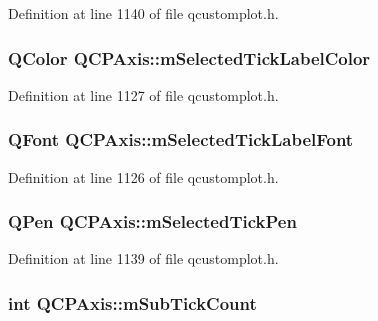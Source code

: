 Definition at line 1140 of file qcustomplot.\-h.

\hypertarget{class_q_c_p_axis_a3bcad40902f45dc4c991a2c3e4d31d70}{
\subsubsection[{m\-Selected\-Tick\-Label\-Color}]{\setlength{\rightskip}{0pt plus 5cm}Q\-Color Q\-C\-P\-Axis\-::m\-Selected\-Tick\-Label\-Color\hspace{0.3cm}{\ttfamily [protected]}}}\label{class_q_c_p_axis_a3bcad40902f45dc4c991a2c3e4d31d70}


Definition at line 1127 of file qcustomplot.\-h.

\hypertarget{class_q_c_p_axis_a4f2e4919da9615dac612662c249b1119}{
\subsubsection[{m\-Selected\-Tick\-Label\-Font}]{\setlength{\rightskip}{0pt plus 5cm}Q\-Font Q\-C\-P\-Axis\-::m\-Selected\-Tick\-Label\-Font\hspace{0.3cm}{\ttfamily [protected]}}}\label{class_q_c_p_axis_a4f2e4919da9615dac612662c249b1119}


Definition at line 1126 of file qcustomplot.\-h.

\hypertarget{class_q_c_p_axis_a9524593dbc75a5c5b29dbd1cb4b37df5}{
\subsubsection[{m\-Selected\-Tick\-Pen}]{\setlength{\rightskip}{0pt plus 5cm}Q\-Pen Q\-C\-P\-Axis\-::m\-Selected\-Tick\-Pen\hspace{0.3cm}{\ttfamily [protected]}}}\label{class_q_c_p_axis_a9524593dbc75a5c5b29dbd1cb4b37df5}


Definition at line 1139 of file qcustomplot.\-h.

\hypertarget{class_q_c_p_axis_ad70198e6ae2801fc409bc3caec707da9}{
\subsubsection[{m\-Sub\-Tick\-Count}]{\setlength{\rightskip}{0pt plus 5cm}int Q\-C\-P\-Axis\-::m\-Sub\-Tick\-Count\hspace{0.3cm}{\ttfamily [protected]}}}\label{class_q_c_p_axis_ad70198e6ae2801fc409bc3caec707da9}


